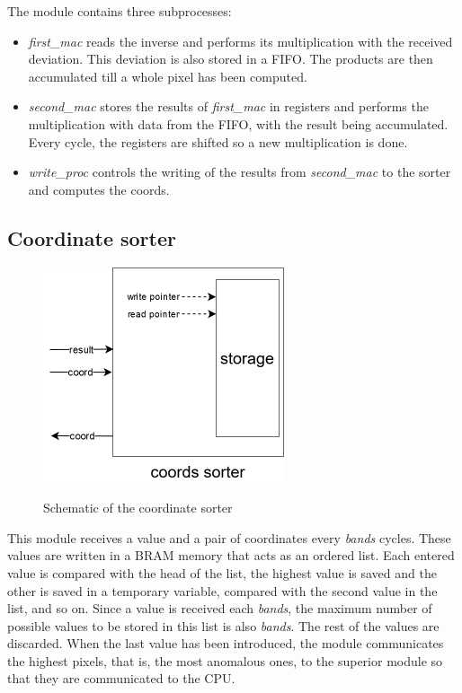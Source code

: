 The module contains three subprocesses:
\begin{itemize}
	\item \emph{first\_mac} reads the inverse and performs its multiplication with the received deviation. This deviation is also stored in a FIFO. The products are then accumulated till a whole pixel has been computed.
	\item \emph{second\_mac} stores the results of \emph{first\_mac} in registers and performs the multiplication with data from the FIFO, with the result being accumulated. Every cycle, the registers are shifted so a new multiplication is done.
	\item \emph{write\_proc} controls the writing of the results from \emph{second\_mac} to the sorter and computes the coords.
\end{itemize}



\subsection{Coordinate sorter}
\begin{figure}[h!]
\centering\textbf{
\includegraphics[height=2.5in]{figures/sort.png}}
\caption{Schematic of the coordinate sorter}
  \label{fig:sorter}
\end{figure}
This module receives a value and a pair of coordinates every \textit{bands} cycles. These values are written in a BRAM memory that acts as an ordered list. Each entered value is compared with the head of the list, the highest value is saved and the other is saved in a temporary variable, compared with the second value in the list, and so on. Since a value is received each \textit{bands}, the maximum number of possible values to be stored in this list is also \textit{bands}. The rest of the values are discarded. When the last value has been introduced, the module communicates the highest pixels, that is, the most anomalous ones, to the superior module so that they are communicated to the CPU.

